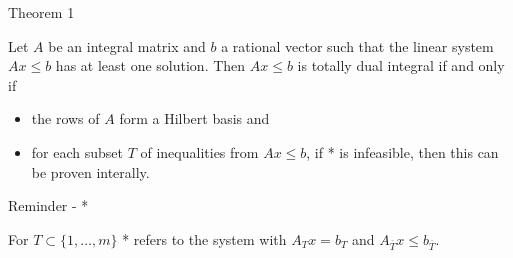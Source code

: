 \documentclass{beamer}
\begin{document}
\begin{frame}

	\begin{block}{Theorem 1}

		Let $A$ be an integral matrix and $b$ a rational vector such that the linear system $Ax \leq b$ has at least one solution. Then $Ax \leq b$ is totally dual integral if and only if\\

		\begin{itemize}

			\item the rows of $A$ form a Hilbert basis and

			\item for each subset $T$ of inequalities from $Ax\leq b$, if * is infeasible, then this can be proven interally.

		\end{itemize}

	\end{block}

	\begin{block}{Reminder - *}

		For $T\subset \{ 1, \dots, m\}$ * refers to the system with $A_T x= b_T$ and $A_{\overline{T}}x\leq b_{\overline{T}}$.

	\end{block}

\end{frame}
\end{document}
